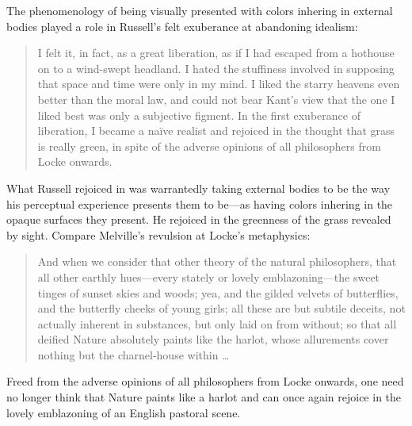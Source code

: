 \documentclass[12pt]{article}
\begin{document}
The phenomenology of being visually presented with colors inhering in external bodies played a role in Russell's felt exuberance at abandoning idealism:
\begin{quote}
	I felt it, in fact, as a great liberation, as if I had escaped from a hothouse on to a wind-swept headland. I hated the stuffiness involved in supposing that space and time were only in my mind. I liked the starry heavens even better than the moral law, and could not bear Kant’s view that the one I liked best was only a subjective figment. In the first exuberance of liberation, I became a naïve realist and rejoiced in the thought that grass is really green, in spite of the adverse opinions of all philosophers from Locke onwards. \citep[48]{Russell:1959fv}
\end{quote}
What Russell rejoiced in was warrantedly taking external bodies to be the way his perceptual experience presents them to be---as having colors inhering in the opaque surfaces they present. He rejoiced in the greenness of the grass revealed by sight. Compare Melville's revulsion at Locke's metaphysics:
\begin{quote}
	And when we consider that other theory of the natural philosophers, that all other earthly hues---every stately or lovely emblazoning---the sweet tinges of sunset skies and woods; yea, and the gilded velvets of butterflies, and the butterfly cheeks of young girls; all these are but subtile deceits, not actually inherent in substances, but only laid on from without; so that all deified Nature absolutely paints like the harlot, whose allurements cover nothing but the charnel-house within \ldots\ \citep[ch. 42]{Melville:1851ms}
\end{quote}
Freed from the adverse opinions of all philosophers from Locke onwards, one need no longer think that Nature paints like a harlot and can once again rejoice in the lovely emblazoning of an English pastoral scene.
\end{document}
